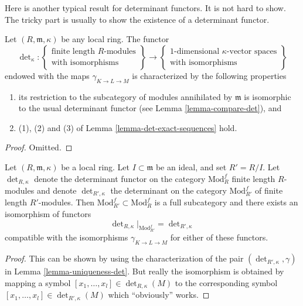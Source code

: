 \medskip\noindent
Here is another typical result for determinant functors.
It is not hard to show. The tricky part is usually to show the
existence of a determinant functor.

\begin{lemma}
\label{lemma-uniqueness-det}
Let $(R, \mathfrak m, \kappa)$ be any local ring.
The functor
$$
\det\nolimits_\kappa :
\left\{
\begin{matrix}
\text{finite length }R\text{-modules} \\
\text{with isomorphisms}
\end{matrix}
\right\}
\longrightarrow
\left\{
\begin{matrix}
1\text{-dimensional }\kappa\text{-vector spaces} \\
\text{with isomorphisms}
\end{matrix}
\right\}
$$
endowed with the maps $\gamma_{K \to L \to M}$ is characterized by
the following properties
\begin{enumerate}
\item its restriction to the subcategory of modules annihilated
by $\mathfrak m$ is isomorphic to the usual determinant functor
(see Lemma \ref{lemma-compare-det}), and
\item (1), (2) and (3) of Lemma \ref{lemma-det-exact-sequences}
hold.
\end{enumerate}
\end{lemma}

\begin{proof}
Omitted.
\end{proof}

\begin{lemma}
\label{lemma-determinant-quotient-ring}
Let $(R, \mathfrak m, \kappa)$ be a local ring.
Let $I \subset \mathfrak m$ be an ideal, and set $R' = R/I$.
Let $\det_{R, \kappa}$ denote the determinant functor
on the category $\text{Mod}^f_R$ finite length $R$-modules
and denote $\det_{R', \kappa}$ the determinant on
the category $\text{Mod}^f_{R'}$ of finite length $R'$-modules.
Then $\text{Mod}^f_{R'} \subset \text{Mod}^f_R$ is a full subcategory
and there exists an isomorphism of functors
$$
\det\nolimits_{R, \kappa}|_{\text{Mod}^f_{R'}}
=
\det\nolimits_{R', \kappa}
$$
compatible with the isomorphisms $\gamma_{K \to L \to M}$
for either of these functors.
\end{lemma}

\begin{proof}
This can be shown by using the characterization
of the pair $(\det\nolimits_{R', \kappa}, \gamma)$
in Lemma \ref{lemma-uniqueness-det}.
But really the isomorphism is obtained by mapping a symbol
$[x_1, \ldots, x_l] \in \det\nolimits_{R, \kappa}(M)$
to the corresponding symbol
$[x_1, \ldots, x_l] \in \det\nolimits_{R', \kappa}(M)$
which ``obviously'' works.
\end{proof}

